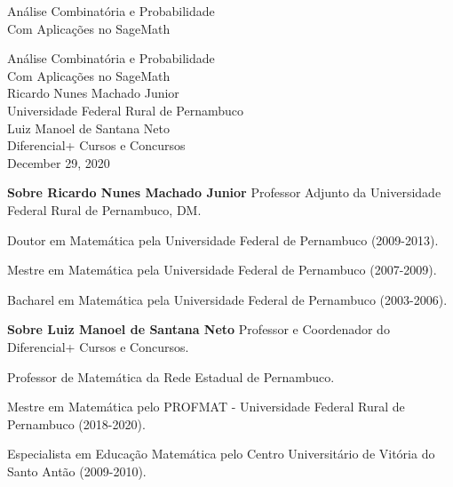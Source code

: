 \documentclass[oneside,10pt,]{book}
\newcommand{\titlepagefont}{\relax}
\numberwithin{equation}{section}
\begin{document}
\frontmatter
\thispagestyle{empty}
{\titlepagefont\centering
\vspace*{0.28\textheight}
{\Huge Análise Combinatória e Probabilidade}\\[2\baselineskip]
{\LARGE Com Aplicações no SageMath}\\
}
\clearpage
\thispagestyle{empty}
\null%
\clearpage
\thispagestyle{empty}
{\titlepagefont\centering
\vspace*{0.14\textheight}
{\Huge Análise Combinatória e Probabilidade}\\[\baselineskip]
{\LARGE Com Aplicações no SageMath}\\[3\baselineskip]
{\Large Ricardo Nunes Machado Junior}\\[0.5\baselineskip]
{\Large Universidade Federal Rural de Pernambuco}\\[3\baselineskip]
{\Large Luiz Manoel de Santana Neto}\\[0.5\baselineskip]
{\Large Diferencial+ Cursos e Concursos}\\[3\baselineskip]
{\Large December 29, 2020}\\}
\clearpage
\thispagestyle{empty}
\noindent\textbf{Sobre Ricardo Nunes Machado Junior}\space\space
Professor Adjunto da Universidade Federal Rural de Pernambuco, DM.%
\par
Doutor em Matemática pela Universidade Federal de Pernambuco (2009-2013).%
\par
Mestre em Matemática pela Universidade Federal de Pernambuco (2007-2009).%
\par
Bacharel em Matemática pela Universidade Federal de Pernambuco (2003-2006).%
\par
\bigskip\noindent\textbf{Sobre Luiz Manoel de Santana Neto}\space\space
Professor e Coordenador do Diferencial+ Cursos e Concursos.%
\par
Professor de Matemática da Rede Estadual de Pernambuco.%
\par
Mestre em Matemática pelo PROFMAT - Universidade Federal Rural de Pernambuco (2018-2020).%
\par
Especialista em Educação Matemática pelo Centro Universitário de Vitória do Santo Antão (2009-2010).%
\par
\end{document}
